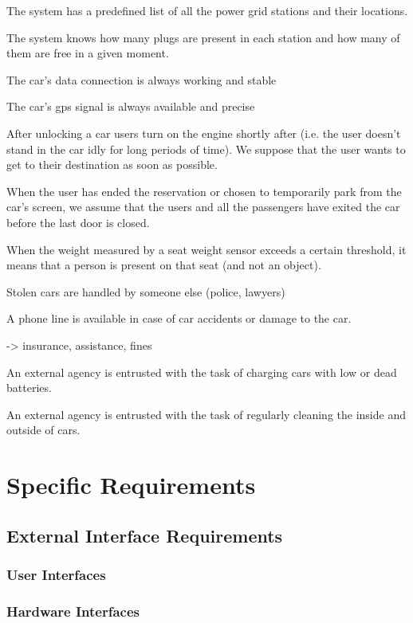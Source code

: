\documentclass[english]{article}
\begin{document}
The system has a predefined list of all the power grid stations and their locations.

The system knows how many plugs are present in each station and how many of them are free in a given moment.


The car’s data connection is always working and stable

The car’s gps signal is always available and precise


After unlocking a car users turn on the engine shortly after (i.e. the user doesn't stand in the car idly for long periods of time). We suppose that the user wants to get to their destination as soon as possible.


When the user has ended the reservation or chosen to temporarily park from the car’s screen, we assume that the users and all the passengers have exited the car before the last door is closed.


When the weight measured by a seat weight sensor exceeds a certain threshold, it means that a person is present on that seat (and not an object).


Stolen cars are handled by someone else (police, lawyers)


A phone line is available in case of car accidents or damage to the car.

-> insurance, assistance, fines


An external agency is entrusted with the task of charging cars with low or dead batteries.


An external agency is entrusted with the task of regularly cleaning the inside and outside of cars.


\newpage

\section{Specific Requirements}

\subsection{External Interface Requirements}

\subsubsection{User Interfaces}

\subsubsection{Hardware Interfaces}
\end{document}
